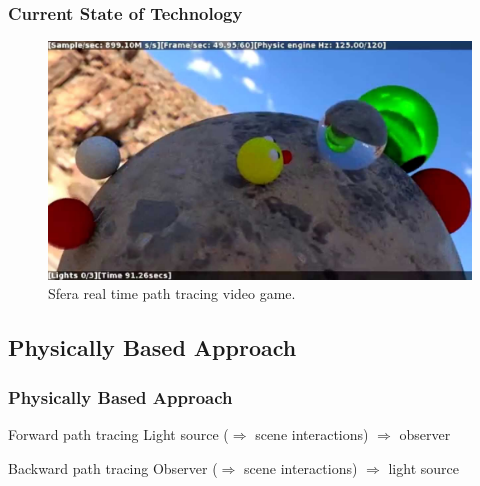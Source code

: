 \documentclass{beamer}
\begin{document}
\begin{frame}
    \frametitle{Current State of Technology}
    \begin{figure}[H]
        \includegraphics[scale=0.2]{sfera}
        \centering
        \caption{Sfera real time path tracing video game.}
    \end{figure}
\end{frame}

\subsection{Physically Based Approach}
\begin{frame}
    \frametitle{Physically Based Approach}
    \begin{block}{Forward path tracing}
        Light source (\(\Rightarrow\) scene interactions) \(\Rightarrow\) observer
    \end{block}
    \begin{block}{Backward path tracing}
        Observer (\(\Rightarrow\) scene interactions) \(\Rightarrow\) light source
    \end{block}
\end{frame}
\end{document}
